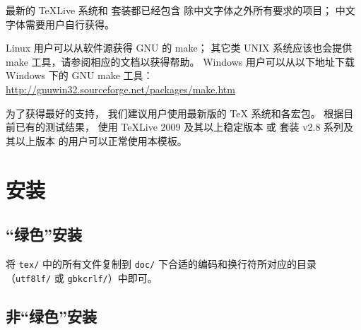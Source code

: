 	最新的 \TeX{}Live 系统和 \CTeX{} 套装都已经包含%
	除中文字体之外所有要求的项目；
	中文字体需要用户自行获得。

	Linux 用户可以从软件源获得 GNU 的 make；
	其它类 UNIX 系统应该也会提供 make 工具，请参阅相应的文档以获得帮助。%
	Windows 用户可以从以下地址下载 Windows 下的 GNU make 工具：\\
	\hspace*{\parindent}%
	\url{http://gnuwin32.sourceforge.net/packages/make.htm}

	为了获得最好的支持，
	我们建议用户使用最新版的 \TeX{} 系统和各宏包。
	根据目前已有的测试结果，
	使用 \TeX{}Live 2009 及其以上稳定版本%
	或 \CTeX{} 套装 v2.8 系列及其以上版本
	的用户可以正常使用本模板。
	
	\section{安装}\label{sec:inst}
	\subsection{“绿色”安装}

	将 \verb|tex/| 中的所有文件复制到 %
	\verb|doc/| 下合适的编码和换行符所对应的目录%
	（\verb|utf8lf/| 或 \verb|gbkcrlf/|）中即可。

	\subsection{非“绿色”安装}

